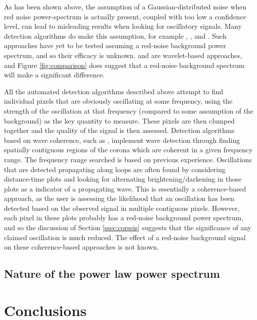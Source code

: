 \documentclass[manuscript]{../aastex52/aastex}
\begin{document}
As has been shown above, the assumption of a Gaussian-distributed
noise when red noise power-spectrum is actually present, coupled with
too low a confidence level, can lead to misleading results when
looking for oscillatory signals.  Many detection algorithms do make
this assumption, for example \cite{2004SoPh..223....1D},
\cite{2007SoPh..241..397N}, \cite{2008SoPh..248..395S} and
\cite{2010SoPh..264..403I}.  Such approaches have yet to be tested
assuming a red-noise background power spectrum, and so their efficacy
is unknown.  \cite{2004SoPh..223....1D} and \cite{2008SoPh..248..395S}
are wavelet-based approaches, and Figure \ref{fig:comparison} does
suggest that a red-noise background spectrum will make a significant
difference. 

All the automated detection algorithms described above attempt to find
individual pixels that are obviously oscillating at some frequency,
using the strength of the oscillation at that frequency (compared to
some assumption of the background) as the key quantity to measure.
These pixels are then clumped together and the quality of the signal
is then assessed.  Detection algorithms based on wave coherence, such
as \cite{2008SoPh..252..321M}, implement wave detection through
finding spatially contiguous regions of the corona which are coherent
in a given frequency range.  The frequency range searched is based on
previous experience.  Oscillations that are detected propagating along
loops are often found by considering distance-time plots
\cite{demoortel2000} and looking for alternating brightening/darkening
in those plots as a indicator of a propagating wave.  This is
essentially a coherence-based approach, as the user is assessing the
likelihood that an oscillation has been detected based on the observed
signal in multiple contiguous pixels.  However, each pixel in these
plots probably has a red-noise background power spectrum, and so the
discussion of Section \ref{ssec:corseis} suggests that the
significance of any claimed oscillation is much reduced.  The effect
of a red-noise background signal on these coherence-based approaches
is not known.


\subsection{Nature of the power law power spectrum}\label{ssec:nplps}


\section{Conclusions}\label{sec:conc}
\end{document}
